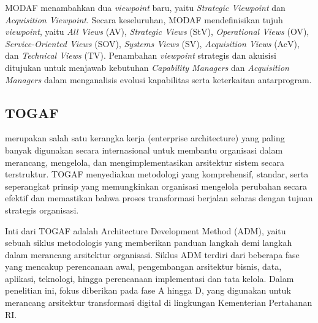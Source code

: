 MODAF menambahkan dua \textit{viewpoint} baru, yaitu \textit{Strategic Viewpoint} dan \textit{Acquisition Viewpoint}.
Secara keseluruhan, MODAF mendefinisikan tujuh \textit{viewpoint}, yaitu \textit{All Views} (AV), \textit{Strategic Views} (StV), \textit{Operational Views} (OV), \textit{Service-Oriented Views} (SOV), \textit{Systems Views} (SV), \textit{Acquisition Views} (AcV), dan \textit{Technical Views} (TV).
Penambahan \textit{viewpoint} strategis dan akuisisi ditujukan untuk menjawab kebutuhan \textit{Capability Managers} dan \textit{Acquisition Managers} dalam menganalisis evolusi kapabilitas serta keterkaitan antarprogram.

\subsection{TOGAF}
\autocite{togaf2020} merupakan salah satu kerangka kerja (enterprise architecture) yang paling banyak digunakan secara internasional untuk membantu organisasi dalam merancang, mengelola, dan mengimplementasikan arsitektur sistem secara terstruktur.
TOGAF menyediakan metodologi yang komprehensif, standar, serta seperangkat prinsip yang memungkinkan organisasi mengelola perubahan secara efektif dan memastikan bahwa proses transformasi berjalan selaras dengan tujuan strategis organisasi.

Inti dari TOGAF adalah Architecture Development Method (ADM), yaitu sebuah siklus metodologis yang memberikan panduan langkah demi langkah dalam merancang arsitektur organisasi.
Siklus ADM terdiri dari beberapa fase yang mencakup perencanaan awal, pengembangan arsitektur bisnis, data, aplikasi, teknologi, hingga perencanaan implementasi dan tata kelola.
Dalam penelitian ini, fokus diberikan pada fase A hingga D, yang digunakan untuk merancang arsitektur transformasi digital di lingkungan Kementerian Pertahanan RI.

